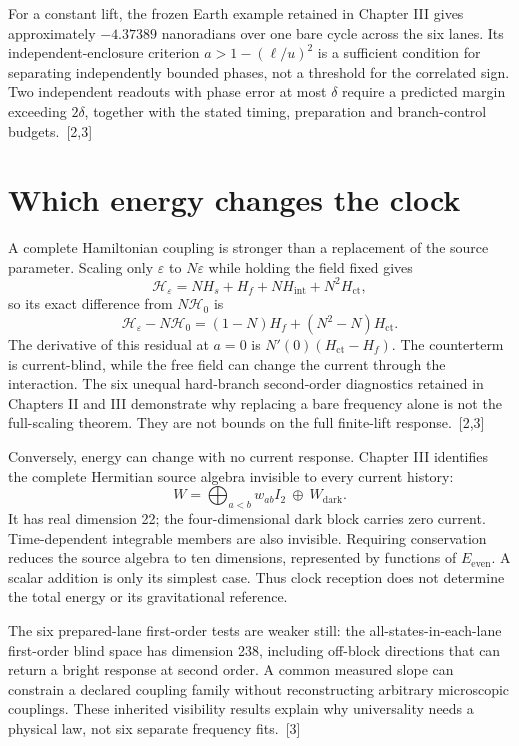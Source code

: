 \documentclass[10pt,twocolumn,letterpaper]{article}
\begin{document}
For a constant lift, the frozen Earth example retained in Chapter III gives approximately $-4.37389$ nanoradians over one bare cycle across the six lanes. Its independent-enclosure criterion $a>1-(\ell/u)^2$ is a sufficient condition for separating independently bounded phases, not a threshold for the correlated sign. Two independent readouts with phase error at most $\delta$ require a predicted margin exceeding $2\delta$, together with the stated timing, preparation and branch-control budgets.~[2,3]


\section{Which energy changes the clock}
A complete Hamiltonian coupling is stronger than a replacement of the source parameter. Scaling only $\varepsilon$ to $N\varepsilon$ while holding the field fixed gives
\[
 \mathcal H_\varepsilon=NH_s+H_f+NH_{\mathrm{int}}+N^2H_{\mathrm{ct}},
\]
so its exact difference from $N\mathcal H_0$ is
\[
 \mathcal H_\varepsilon-N\mathcal H_0
 =(1-N)H_f+(N^2-N)H_{\mathrm{ct}}.
\]
The derivative of this residual at $a=0$ is $N'(0)(H_{\mathrm{ct}}-H_f)$. The counterterm is current-blind, while the free field can change the current through the interaction. The six unequal hard-branch second-order diagnostics retained in Chapters II and III demonstrate why replacing a bare frequency alone is not the full-scaling theorem. They are not bounds on the full finite-lift response.~[2,3]

Conversely, energy can change with no current response. Chapter III identifies the complete Hermitian source algebra invisible to every current history:
\[
 W=\bigoplus_{a<b}w_{ab}I_2\ \oplus\ W_{\mathrm{dark}}.
\]
It has real dimension 22; the four-dimensional dark block carries zero current. Time-dependent integrable members are also invisible. Requiring conservation reduces the source algebra to ten dimensions, represented by functions of $E_{\mathrm{even}}$. A scalar addition is only its simplest case. Thus clock reception does not determine the total energy or its gravitational reference.

The six prepared-lane first-order tests are weaker still: the all-states-in-each-lane first-order blind space has dimension 238, including off-block directions that can return a bright response at second order. A common measured slope can constrain a declared coupling family without reconstructing arbitrary microscopic couplings. These inherited visibility results explain why universality needs a physical law, not six separate frequency fits.~[3]
\end{document}
